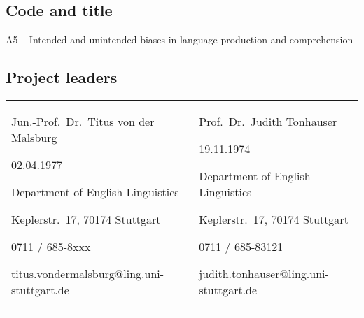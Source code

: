 \documentclass[11pt]{article}
\begin{document}



\subsection{Code and title}

\noindent A5 -- Intended and unintended biases in language production and comprehension

\subsection{Project leaders}

\begin{tabular}{p{}p{}}
  Jun.-Prof.\ Dr.\ Titus von der Malsburg \par
  02.04.1977 \par
  Department of English Linguistics \par
  Keplerstr.\ 17, 70174 Stuttgart \par
  0711 / 685-8xxx \par
  titus.vondermalsburg@ling.uni-stuttgart.de
  & 
  Prof.\ Dr.\ Judith Tonhauser \par
  19.11.1974 \par
  Department of English Linguistics \par
  Keplerstr.\ 17, 70174 Stuttgart \par
  0711 / 685-83121 \par
  judith.tonhauser@ling.uni-stuttgart.de
\end{tabular}
\end{document}
